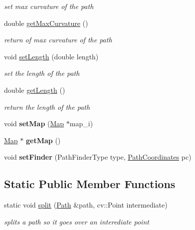 \begin{DoxyCompactItemize}
\begin{DoxyCompactList}\small\item\em set max curvature of the path \end{DoxyCompactList}\item 
double \mbox{\hyperlink{class_path_a613552d171c766462f422593b4957ecc}{get\+Max\+Curvature}} ()
\begin{DoxyCompactList}\small\item\em return of max curvature of the path \end{DoxyCompactList}\item 
void \mbox{\hyperlink{class_path_ad723ba990a07d7542703770a09df52a7}{set\+Length}} (double length)
\begin{DoxyCompactList}\small\item\em set the length of the path \end{DoxyCompactList}\item 
double \mbox{\hyperlink{class_path_ad497d2a12a47bc52a316da83dbe6acbc}{get\+Length}} ()
\begin{DoxyCompactList}\small\item\em return the length of the path \end{DoxyCompactList}\item 
\mbox{\label{class_path_a68a50ad6f0fd39d0b272bcb62655b475}} 
void {\bfseries set\+Map} (\mbox{\hyperlink{class_map}{Map}} $\ast$map\+\_\+i)
\item 
\mbox{\label{class_path_abacf46c32c4f36a79c2faf21a9a01270}} 
\mbox{\hyperlink{class_map}{Map}} $\ast$ {\bfseries get\+Map} ()
\item 
\mbox{\label{class_path_a96f8912c754b3861697aad04018276f6}} 
void {\bfseries set\+Finder} (Path\+Finder\+Type type, \mbox{\hyperlink{class_path_coordinates}{Path\+Coordinates}} pc)
\end{DoxyCompactItemize}
\subsection*{Static Public Member Functions}
\begin{DoxyCompactItemize}
\item 
\mbox{\label{class_path_a034538715379fdc31b3fdd093354d4d4}} 
static void \mbox{\hyperlink{class_path_a034538715379fdc31b3fdd093354d4d4}{split}} (\mbox{\hyperlink{class_path}{Path}} \&path, cv\+::\+Point intermediate)
\begin{DoxyCompactList}\small\item\em splits a path so it goes over an interediate point \end{DoxyCompactList}\end{DoxyCompactItemize}
